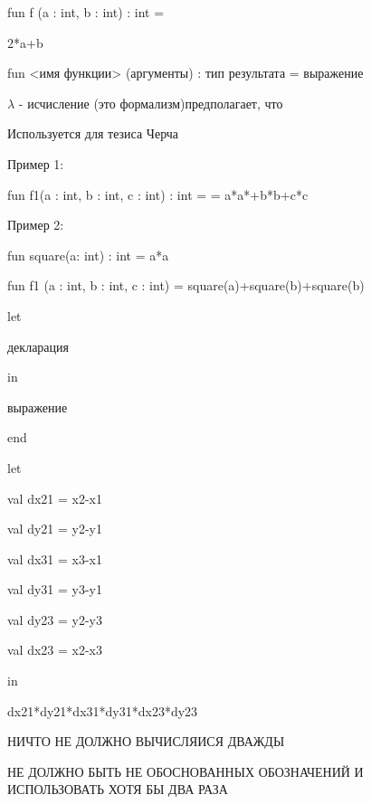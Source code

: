 \documentclass{article}
\begin{document}
fun f (a : int, b : int) : int =

2*a+b

\vspace{5mm}

fun <имя функции> (аргументы) : тип результата = выражение

\vspace{3mm}



$\lambda$ - исчисление (это формализм)предполагает, что 

Используется для тезиса Черча


Пример 1:

fun f1(a : int, b : int, c : int) : int = 
= a*a*+b*b+c*c

Пример 2:

fun square(a: int) : int = a*a 

fun f1 (a : int, b : int, c : int) = square(a)+square(b)+square(b) 

\vspace{5mm}
let 

\hspace{5mm} декларация

in 

\hspace{5mm} выражение

end

\vspace{5mm}

let 

\hspace{2mm} val dx21 = x2-x1

\hspace{2mm} val dy21 = y2-y1

\hspace{2mm} val dx31 = x3-x1

\hspace{2mm} val dy31 = y3-y1

\hspace{2mm} val dy23 = y2-y3

\hspace{2mm} val dx23 = x2-x3

in 

dx21*dy21*dx31*dy31*dx23*dy23


\vspace{2mm}

 НИЧТО НЕ ДОЛЖНО ВЫЧИСЛЯИСЯ ДВАЖДЫ
 
 \vspace{2mm}

НЕ ДОЛЖНО БЫТЬ НЕ ОБОСНОВАННЫХ ОБОЗНАЧЕНИЙ И ИСПОЛЬЗОВАТЬ ХОТЯ БЫ ДВА РАЗА
\end{document}
